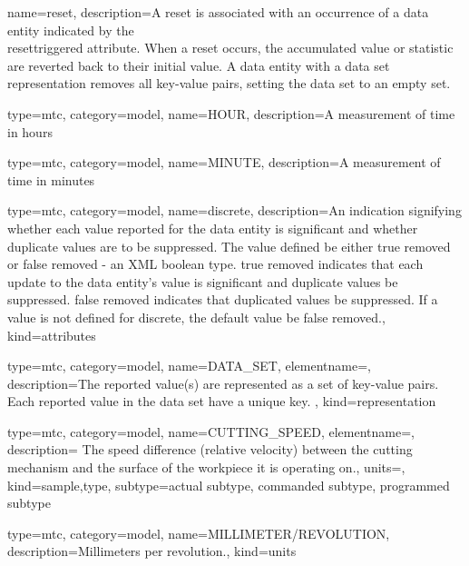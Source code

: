 {
  name={reset},
  description={A reset is associated with an occurrence of a \gls{data entity} indicated by the \\\gls{resettriggered} attribute. When a reset occurs, the accumulated value or statistic are reverted back to their initial value. A \gls{data entity} with a \gls{data set} representation removes all \glspl{key-value pair}, setting the \gls{data set} to an empty set.}
}


{
  type=mtc,
  category=model,
  name={HOUR},
  description={A measurement of time in hours}
}


{
  type=mtc,
  category=model,
  name={MINUTE},
  description={A measurement of time in minutes}
}


{
  type=mtc,
  category=model,
  name={discrete},
  description={An indication signifying whether each value reported for the \gls{data entity} is significant and whether duplicate values are to be suppressed.
  \newline The value defined \MUST be either \gls{true removed} or \gls{false removed} - an XML boolean type.
  \newline \gls{true removed} indicates that each update to the \gls{data entity}'s value is significant and duplicate values \MUSTNOT be suppressed.
  \newline \gls{false removed} indicates that duplicated values \MUST be suppressed.
  \newline If a value is not defined for \gls{discrete}, the default value \MUST be \gls{false removed}.},
  kind={attributes}
}


{
  type=mtc,
  category=model,
  name={DATA\_SET},
  elementname=,
  description={The reported value(s) are represented as a set of \glspl{key-value pair}.
  \newline Each reported value in the \gls{data set} \MUST have a unique key. },
  kind={representation}
}


{
  type=mtc,
  category=model,
  name={CUTTING\_SPEED},
  elementname=,
  description={ The speed difference (relative velocity) between the cutting mechanism and the surface of the workpiece it is operating on.},
  units=,
  kind={sample,type},
  subtype={\gls{actual subtype}, \gls{commanded subtype}, \gls{programmed subtype}}
}


{
  type=mtc,
  category=model,
  name={MILLIMETER/REVOLUTION},
  description={Millimeters per revolution.},
  kind={units}
}


